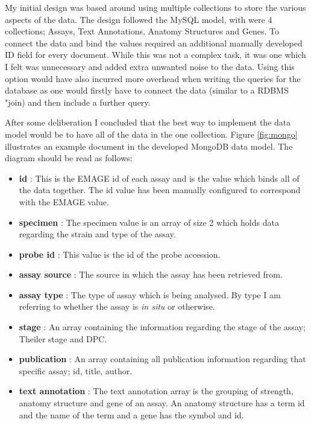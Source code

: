 My initial design was based around using multiple collections to store the various aspects of the data. The design followed the MySQL model, with were 4 collections; Assays, Text Annotations, Anatomy Structures and Genes. To connect the data and bind the values required an additional manually developed ID field for every document. While this was not a complex task, it was one which I felt was unnecessary and added extra unwanted noise to the data. Using this option would have also incurred more overhead when writing the queries for the database as one would firstly have to connect the data (similar to a RDBMS "join) and then include a further query.

After some deliberation I concluded that the best way to implement the data model would be to have all of the data in the one collection. Figure \ref{fig:mongo} illustrates an example document in the developed MongoDB data model. The diagram should be read as follows:

\begin{itemize}
\item \textbf{id} : This is the EMAGE id of each assay and is the value which binds all of the data together. The id value has been manually configured to correspond with the EMAGE value.
\item \textbf{specimen} : The specimen value is an array of size 2 which holds data regarding the strain and type of the assay.
\item \textbf{probe id} : This value is the id of the probe accession.
\item \textbf{assay source} : The source in which the assay has been retrieved from.
\item \textbf{assay type} : The type of assay which is being analysed. By type I am referring to whether the assay is \textit{in situ} or otherwise.
\item \textbf{stage} : An array containing the information regarding the stage of the assay; Theiler stage and DPC.
\item \textbf{publication} : An array containing all publication information regarding that specific assay; id, title, author.
\item \textbf{text annotation} : The text annotation array is the grouping of strength, anatomy structure and gene of an assay. An anatomy structure has a term id and the name of the term and a gene has the symbol and id.
\end{itemize}


